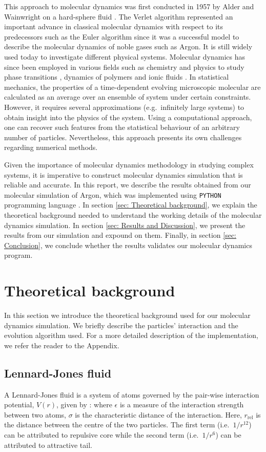 \documentclass[pra,aps,superscriptaddress,amssymb,amsmath,reprint,noeprint,floatfix]{revtex4-2}
\begin{document}
This approach to molecular dynamics was first conducted in 1957 by Alder and Wainwright on a hard-sphere fluid \cite{doi:10.1063/1.1743957}. The Verlet algorithm\cite{PhysRev.159.98} represented an important advance in classical molecular dynamics with respect to its predecessors such as the Euler algorithm since it was a successful model to describe the molecular dynamics of noble gases such as Argon. It is still widely used today to investigate different physical systems. Molecular dynamics has since been employed in various fields such as chemistry and physics to study phase transitions \cite{PhysRevLett.67.1886}, dynamics of polymers \cite{PhysRevA.33.3628} and ionic fluids \cite{10.1002/cphc.200700552}. 
In statistical mechanics, the properties of a time-dependent evolving microscopic molecular are calculated as an average over an ensemble of system under certain constraints. However, it requires several approximations (e.g.\ infinitely large systems) to obtain insight into the physics of the system. Using a computational approach, one can recover such features from the statistical behaviour of an arbitrary number of particles. Nevertheless, this approach presents its own challenges regarding numerical methods.

Given the importance of molecular dynamics methodology in studying complex systems, it is imperative to construct molecular dynamics simulation that is reliable and accurate. In this report, we describe the results obtained from our molecular simulation of Argon, which was implemented using \texttt{PYTHON} programming language \cite{python}. In section \ref{sec: Theoretical background}, we explain the theoretical background needed to understand the working details of the molecular dynamics simulation. In section \ref{sec: Results and Discussion}, we present the results from our simulation and expound on them. Finally, in section \ref{sec: Conclusion}, we conclude whether the results validates our molecular dynamics program.

\section{\label{sec: Theoretical background}Theoretical background}
In this section we introduce the theoretical background used for our molecular dynamics simulation. We briefly describe the particles' interaction and the evolution algorithm used. For a more detailed description of the implementation, we refer the reader to the Appendix.

\subsection{\label{subsec: Lennard-Jones fluid}Lennard-Jones fluid}
A Lennard-Jones fluid is a system of atoms governed by the pair-wise interaction potential, $V(r)$, given by \cite{tudelftnotes}:
\LJpotential
where $\epsilon$ is a measure of the interaction strength between two atoms, $\sigma$ is the characteristic distance of the interaction. Here, $r_\mathrm{rel}$ is the distance between the centre of the two particles. The first term (i.e.\ $1/r^{12}$) can be attributed to repulsive core while the second term (i.e.\ $1/r^6$) can be attributed to attractive tail. 
\end{document}
